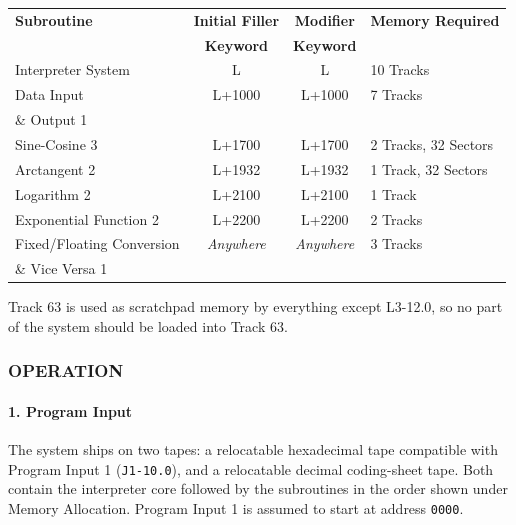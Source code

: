 \begin{table}[h]
\centering
\setlength{\extrarowheight}{3pt}
\begin{tabular}{|l|c|c|l|}
\hline
\textbf{Subroutine} & \textbf{Initial Filler} & \textbf{Modifier} & \textbf{Memory Required} \\ 
                    & \textbf{Keyword}        & \textbf{Keyword}  &                          \\ \hline
Interpreter System  & L                       & L                 & 10 Tracks \\ \hline
Data Input          & L+1000                  & L+1000            & 7 Tracks  \\ 
\hfil \& Output 1   &                         &                   &           \\ \hline
Sine-Cosine 3       & L+1700                  & L+1700            & 2 Tracks, 32 Sectors \\ \hline
Arctangent 2        & L+1932                  & L+1932            & 1 Track, 32 Sectors  \\ \hline
Logarithm 2         & L+2100                  & L+2100            & 1 Track              \\ \hline
Exponential Function 2 & L+2200               & L+2200            & 2 Tracks             \\ \hline
Fixed/Floating Conversion & \textit{Anywhere} & \textit{Anywhere} & 3 Tracks             \\ 
\hfil \& Vice Versa 1     &                   &                   &                      \\ \hline
\end{tabular}
\end{table}

Track 63 is used as scratchpad memory by everything except L3-12.0, so no part of the system should be loaded into Track 63.

\subsubsection*{OPERATION}

\paragraph{1. Program Input}
The system ships on two tapes: a relocatable hexadecimal tape compatible with Program Input 1 (\texttt{J1-10.0}), and a relocatable decimal coding-sheet tape. Both contain the interpreter core followed by the subroutines in the order shown under Memory Allocation. Program Input 1 is assumed to start at address \texttt{0000}.

